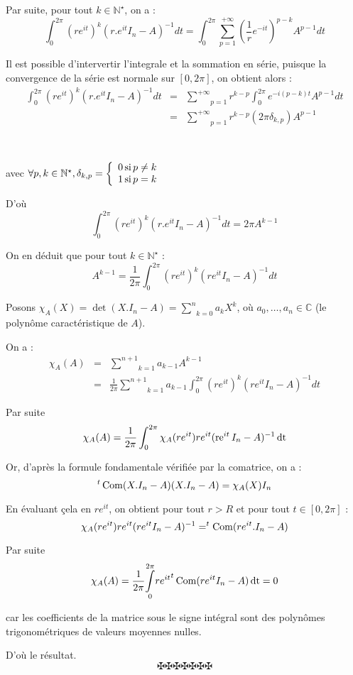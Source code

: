 Par suite, pour tout $k \in \mathbb{N}^{\star}$, on a :
\[ \int^{2 \pi}_0 (r e^{i t})^k (r.e^{i t} I_n - A)^{- 1} d t = \int^{2 \pi}_0
   \underset{p = 1}{\overset{+ \infty}{\sum}} \left( \frac{1}{r} e^{- i t}
   \right)^{p - k} A^{p - 1} d t \]


Il est possible d'intervertir l'integrale et la sommation en s{\'e}rie,
puisque la convergence de la s{\'e}rie est normale sur $[0, 2 \pi]$, on
obtient alors :
\begin{eqnarray*}
  \int^{2 \pi}_0 (r e^{i t})^k (r.e^{i t} I_n - A)^{- 1} d t & = & \underset{p
  = 1}{\overset{+ \infty}{\sum}} r^{k - p} \int^{2 \pi}_0 e^{- i (p - k) t}
  A^{p - 1} d t\\
  & = & \underset{p = 1}{\overset{+ \infty}{\sum}} r^{k - p} (2 \pi
  \delta_{k, p}) A^{p - 1}
\end{eqnarray*}


\

avec $\forall p, k \in \mathbb{N}^{\star}, \delta_{k, p} =
\left\{\begin{array}{l}
  0 \operatorname{si} p \neq k\\
  1 \operatorname{si} p = k
\end{array}\right. \text{}$

D'o{\`u}
\[ \int^{2 \pi}_0 (r e^{i t})^k (r.e^{i t} I_n - A)^{- 1} d t = 2 \pi A^{k -
   1} \]


On en d{\'e}duit que pour tout $k \in \mathbb{N}^{\star}$ :
\[ A^{k - 1} = \frac{1}{2 \pi} \int^{2 \pi}_0 (r e^{i t})^k (r e^{i t} I_n -
   A)^{- 1} d t \]


Posons $\chi_A (X) = \det (X.I_n - A) = \underset{k = 0}{\overset{n}{\sum}}
a_k X^k$, o{\`u} $a_0, \ldots, a_n \in \mathbb{C}$ (le polyn{\^o}me
caract{\'e}ristique de $A$).

On a :
\begin{eqnarray*}
  \chi_A (A) & = & \underset{k = 1}{\overset{n + 1}{\sum}} a_{k - 1} A^{k -
  1}\\
  & = & \frac{1}{2 \pi} \underset{k = 1}{\overset{n + 1}{\sum}} a_{k - 1}
  \int^{2 \pi}_0 (r e^{i t})^k (r e^{i t} I_n - A)^{- 1} d t
\end{eqnarray*}


Par suite
\[ \chi_A (A) = \frac{1}{2 \pi} \int^{2 \pi}_0 \chi_A (r e^{i t}) r e^{i t}
   (\operatorname{re}^{i t} I_n - A)^{- 1} \operatorname{dt} \]


Or, d'apr{\`e}s la formule fondamentale v{\'e}rifi{\'e}e par la comatrice, on
a :
\[ ^t \operatorname{Com} (X.I_n - A) (X.I_n - A) = \chi_A (X) I_n \]


En {\'e}valuant {\c c}ela en $r e^{i t}$, on obtient pour tout $r > R$ et pour
tout $t \in [0, 2 \pi]$ :
\[ \chi_A (r e^{i t}) r e^{i t} (r e^{i t} I_n - A)^{- 1} =^t \operatorname{Com} (r
   e^{i t} .I_n - A) \]


Par suite
\[ \chi_A (A) = \frac{1}{2 \pi} \overset{2 \pi}{\underset{0}{\int}} {r e^{i
   t}}^t \operatorname{Com} (r e^{i t} I_n - A) \operatorname{dt} = 0 \]


car les coefficients de la matrice sous le signe int{\'e}gral sont des
polyn{\^o}mes trigonom{\'e}triques de valeurs moyennes nulles.

D'o{\`u} le r{\'e}sultat.
\[ \maltese \maltese \maltese \maltese \maltese \maltese \maltese \]
